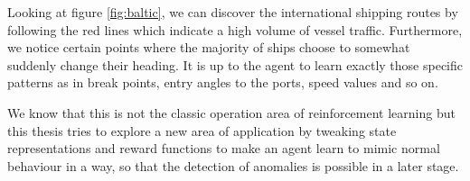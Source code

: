 Looking at figure \ref{fig:baltic}, we can discover the international shipping routes by following the red lines which indicate a high volume of vessel traffic. Furthermore, we notice certain points where the majority of ships choose to somewhat suddenly change their heading. It is up to the agent to learn exactly those specific patterns as in break points, entry angles to the ports, speed values and so on. 
\par
We know that this is not the classic operation area of reinforcement learning but this thesis tries to explore a new area of application by tweaking state representations and reward functions to make an agent learn to mimic normal behaviour in a way, so that the detection of anomalies is possible in a later stage.
\newpage
